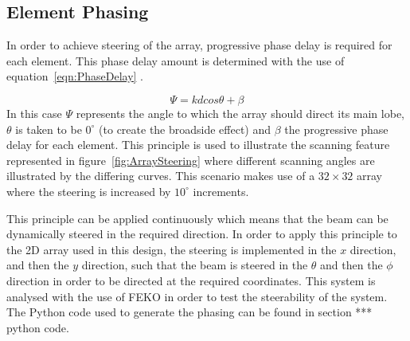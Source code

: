 \documentclass[11pt]{witseiepaper}
\begin{document}
\subsection{Element Phasing} \label{sec:ElementPhasing}
In order to achieve steering of the array, progressive phase delay is required for each element. This phase delay amount is determined with the use of equation~\ref{eqn:PhaseDelay} \cite[p.~301]{Balanis}.

\begin{equation} \label{eqn:PhaseDelay}
\Psi = k d cos \theta + \beta
\end{equation}
In this case $\Psi$ represents the angle to which the array should direct its main lobe, $\theta$ is taken to be $0^{\circ}$ (to create the broadside effect) and $\beta$ the progressive phase delay for each element.
This principle is used to illustrate the scanning feature represented in figure~\ref{fig:ArraySteering} where different scanning angles are illustrated by the differing curves. This scenario makes use of a $32 \times 32$ array where the steering is increased by $10^{\circ}$ increments.

This principle can be applied continuously which means that the beam can be dynamically steered in the required direction.
In order to apply this principle to the 2D array used in this design, the steering is implemented in the $x$ direction, and then the $y$ direction, such that the beam is steered in the $\theta$ and then the $\phi$ direction in order to be directed at the required coordinates.
This system is analysed with the use of FEKO in order to test the steerability of the system. The Python code used to generate the phasing can be found in section *** python code.
\end{document}
